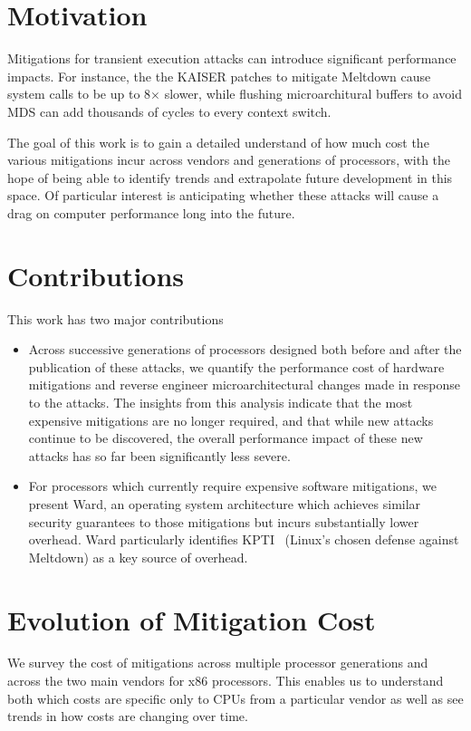 \section{Motivation}
Mitigations for transient execution attacks can introduce significant performance impacts.
For instance, the the KAISER patches to mitigate Meltdown cause system calls to be up to 8$\times$ slower, while flushing microarchitural buffers to avoid MDS can add thousands of cycles to every context switch.

The goal of this work is to gain a detailed understand of how much cost the various mitigations incur across vendors and generations of processors, with the hope of being able to identify trends and extrapolate future development in this space.
Of particular interest is anticipating whether these attacks will cause a drag on computer performance long into the future.

\section{Contributions}
This work has two major contributions
\begin{itemize}
\item Across successive generations of processors designed both before and after the publication of these attacks, we quantify the performance cost of hardware mitigations and reverse engineer microarchitectural changes made in response to the attacks. The insights from this analysis indicate that the most expensive mitigations are no longer required, and that while new attacks continue to be discovered, the overall performance impact of these new attacks has so far been significantly less severe.

\item For processors which currently require expensive software mitigations, we present Ward, an operating system architecture which achieves similar security guarantees to those mitigations but incurs substantially lower overhead. Ward particularly identifies KPTI~\cite{linux:kpti} (Linux's chosen defense against Meltdown) as a key source of overhead.
\end{itemize}

\section{Evolution of Mitigation Cost}
We survey the cost of mitigations across multiple processor generations and across the two main vendors for x86 processors.
This enables us to understand both which costs are specific only to CPUs from a particular vendor as well as see trends in how costs are changing over time.

